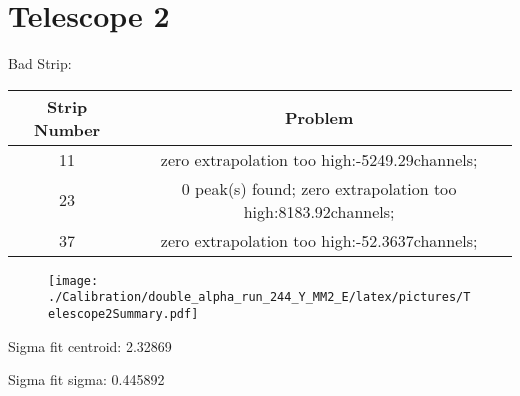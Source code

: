 \documentclass[a4paper,6pt]{article}
\begin{document}
\section{Telescope 2 }
 Bad Strip:
\begin{center}
\begin{tabular}{ | c | c | } 
\hline 
 Strip Number & Problem \\ \hline 
11 &  zero extrapolation too high:-5249.29channels;  \\ \hline 
23 &  0 peak(s) found; zero extrapolation too high:8183.92channels;  \\ \hline 
37 &  zero extrapolation too high:-52.3637channels;  \\ \hline 
\end{tabular} 
\end{center}
\begin{figure}[htcb!]
\begin{center}
\texttt{[image: ./Calibration/double\_alpha\_run\_244\_Y\_MM2\_E/latex/pictures/Telescope2Summary.pdf]}
\end{center}
\end{figure}
\pagebreak
Sigma fit centroid: 2.32869

Sigma fit sigma: 0.445892
\end{document}

